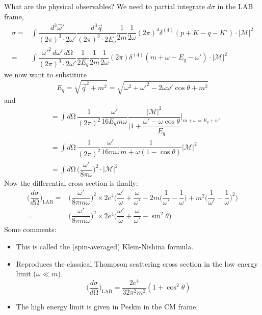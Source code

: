 \begin{cor}
What are the physical observables? We need to partial integrate $d\sigma $ in the LAB frame,
\[\begin{align*}
\sigma =&\int \dfrac{d^3\vec{\omega }'}{(2\pi )^3\cdot 2\omega '}\dfrac{d^3\vec{q}}{(2\pi )^3\cdot 2E_{q}}\dfrac{1}{2m}\dfrac{1}{2\omega }(2\pi )^{4}\delta ^{(4)}(p+K-q-K')\cdot |\mathcal{M}|^2\\
=&\int \dfrac{\omega '^2\,d\omega '\,d\mathrm{\Omega} }{(2\pi )^3\cdot 2\omega '}\dfrac{1}{2E_{q}}\dfrac{1}{2m}\dfrac{1}{2\omega }(2\pi )\delta ^{(4)}(m+\omega -E_{q}-\omega ')\cdot |\mathcal{M}|^2
\end{align*}\]
we now want to substitute 
\[E_{q}=\sqrt{\vec{q}^2+m^2}=\sqrt{\omega ^2+\omega '^2-2\omega \omega '\cos \theta +m^2}\]
and
\[\begin{align*}
&=\int d\mathrm{\Omega} \,\dfrac{1}{(2\pi )^2}\dfrac{\omega '}{16E_{q}m\omega }\dfrac{|\mathcal{M}|^2}{|1+\dfrac{\omega '-\omega \cos \theta }{E_{q}}}\Big|_{m+\omega =E_{q}+w'}\\
&=\int d\mathrm{\Omega} \,\dfrac{1}{(2\pi )^2}\dfrac{\omega '}{16m\omega }\dfrac{1}{m+\omega (1-\cos \theta )}|\mathcal{M}|^2\\
&=\int d\mathrm{\Omega} \,\Big(\dfrac{\omega '}{8\pi \omega }\Big)^2\cdot |\mathcal{M}|^2
\end{align*}\]
Now the differential cross section is finally:
\[\begin{align*}
\Big(\dfrac{d\sigma }{d\mathrm{\Omega} }\Big)_{\mathrm{LAB}}=&\Big(\dfrac{\omega '}{8\pi m\omega }\Big)^2\times 2e^{4}\Big(\dfrac{\omega '}{\omega }+\dfrac{\omega }{\omega '}-2m\Big(\dfrac{1}{\omega '}-\dfrac{1}{\omega }\Big)+m^2\Big(\dfrac{1}{\omega '}-\dfrac{1}{\omega }\Big)^2\Big)\\
=&\Big(\dfrac{\omega '}{8\pi m\omega }\Big)^2\times 2e^{4}\Big(\dfrac{\omega '}{\omega }+\dfrac{\omega }{\omega '}-\sin ^2\theta \Big)
\end{align*}\]
Some comments:
\begin{itemize}
\item[(i)] This is called the (spin-averaged) Klein-Nishina formula.
\item[(ii)] Reproduces the classical Thompson scattering cross section in the low energy limit ($\omega \ll m$)
\[\Big(\dfrac{d\sigma }{d\mathrm{\Omega} }\Big)_{\mathrm{LAB}}=\dfrac{2e^{4}}{32\pi ^2m^2}(1+\cos ^2\theta )\]
\item[(iii)] The high energy limit is given in Peskin in the CM frame.
\end{itemize}
\end{cor}
\vspace{2ex}


